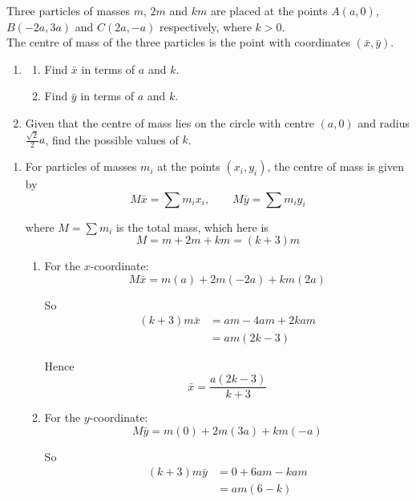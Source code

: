 \documentclass[leqno]{article}
\begin{document}
\begin{enumerate}[
  label=\textbf{\arabic*.},
  leftmargin=*,
  topsep=0pt,
  partopsep=0pt,
  parsep=0pt
]
Three particles of masses $m$, $2m$ and $km$ are placed at the points $A(a,0)$, $B(-2a,3a)$ and $C(2a,-a)$ respectively, where $k>0$. \\

The centre of mass of the three particles is the point with coordinates $(\bar{x}, \bar{y})$. \\

\begin{enumerate}[label=\textbf{(\alph*)}]
  \item
  \begin{enumerate}[label=(\roman*)]
    \item Find $\bar{x}$ in terms of $a$ and $k$.
    \item Find $\bar{y}$ in terms of $a$ and $k$.
  \end{enumerate}
  \item Given that the centre of mass lies on the circle with centre $(a,0)$ and radius $\frac{\sqrt{2}}{2}a$, find the possible values of $k$.  
\end{enumerate}

\vspace*{10pt}

\begin{djsSolution}
\begin{enumerate}[label=\textbf{(\alph*)}, start=1]
  \item For particles of masses $m_i$ at the points $(x_i,y_i)$, the centre of mass is given by
  \[
  M\bar{x}=\sum m_ix_i,\qquad M\bar{y}=\sum m_iy_i
  \]

  where $M=\sum m_i$ is the total mass, which here is
  \[
  M=m+2m+km=(k+3)m
  \]
  \begin{enumerate}[label=\textbf{(\roman*)}, start=1]
    \item For the $x$-coordinate:
    \[
    M\bar{x}=m(a)+2m(-2a)+km(2a)
    \]

    So
    \begin{align*}
    (k+3)m\bar{x} &= am-4am+2kam \\
    &= am(2k-3)
    \end{align*}

    Hence
    \[
    \bar{x}=\frac{a(2k-3)}{k+3}
    \]

    \item For the $y$-coordinate:
    \[
    M\bar{y}=m(0)+2m(3a)+km(-a)
    \]

    So
    \begin{align*}
    (k+3)m\bar{y} &= 0+6am-kam \\
    &= am(6-k)
    \end{align*}


\end{enumerate}
\end{enumerate}
\end{djsSolution}
\end{enumerate}
\end{document}
